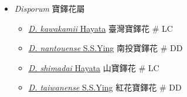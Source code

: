 
  \begin{itemize}
 \item[] \textit{Disporum} 寶鐸花屬
                                
  \begin{itemize}
        \item[] \href{http://www.theplantlist.org/tpl1.1/search?q=Disporum+kawakamii}{\textit{D. kawakamii} Hayata}   臺灣寶鐸花  \# LC
        \item[] \href{http://www.theplantlist.org/tpl1.1/search?q=Disporum+nantouense}{\textit{D. nantouense} S.S.Ying}   南投寶鐸花  \# DD
        \item[] \href{http://www.theplantlist.org/tpl1.1/search?q=Disporum+shimadai}{\textit{D. shimadai} Hayata}   山寶鐸花  \# LC
        \item[] \href{http://www.theplantlist.org/tpl1.1/search?q=Disporum+taiwanense}{\textit{D. taiwanense} S.S.Ying}   紅花寶鐸花  \# DD
  \end{itemize}
  \end{itemize}
